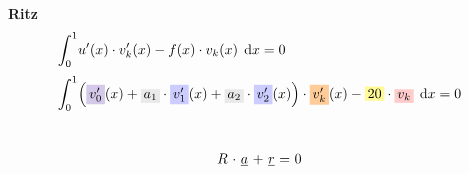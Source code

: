 \documentclass[
final,
a4paper,
oneside,
parskip=full,
headings=standardclasses,
headings=big,
pointednumbers,
fleqn
]{scrartcl}
\newcommand{\tfillb}[1]{\tfillc[#1][blue!20]}
\newcommand{\tfillo}[1]{\tfillc[#1][orange!40]}
\newcommand{\tfilly}[1]{\tfillc[#1][yellow!40]}
\newcommand{\tfillr}[1]{\tfillc[#1][red!20]}
\newcommand{\tfillv}[1]{\tfillc[#1][Violet!20]}
\newcommand{\tfillgr}[1]{\tfillc[#1][Gray!20]}
\newcommand*\difx{\; \mathop{}\!\mathrm{d}x}
\newcommand{\kl}[1]{{\left( #1 \right)}}
\begin{document}
    \newpage
    {\bf{Ritz}} \\
    {\setlength{\abovedisplayskip}{-6pt}
    \setlength{\belowdisplayskip}{-12pt}
    \begin{align*}
        \int_{0}^{1}&{u'\kl{x} \cdot v_k'\kl{x} - f\kl{x} \cdot v_k\kl{x} \difx} = 0  \\[0.1cm]
        \int_{0}^{1}&{\kl{\tfillv{$v_0'$}\kl{x}   + \tfillgr{$a_1$} \cdot \tfillb{$v_1'$}\kl{x}   + \tfillgr{$a_2$} \cdot \tfillb{$v_2'$}\kl{x}} \cdot \tfillo{$v_k'$}\kl{x} - \tfilly{$20$} \cdot \tfillr{$v_k$} \difx} = 0  \\[0.1cm]
    \end{align*}} \\
    {\setlength{\abovedisplayskip}{-6pt}
    \setlength{\belowdisplayskip}{-12pt}
    \begin{align*}
        \begin{array}{r@{\ }c@{\ }c@{\ }c@{\ }c@{\ }c@{\ }l}
            R & \cdot & \uline{a} & + & \uline{r} & = & 0
        \end{array}
    \end{align*}} \\
\end{document}

